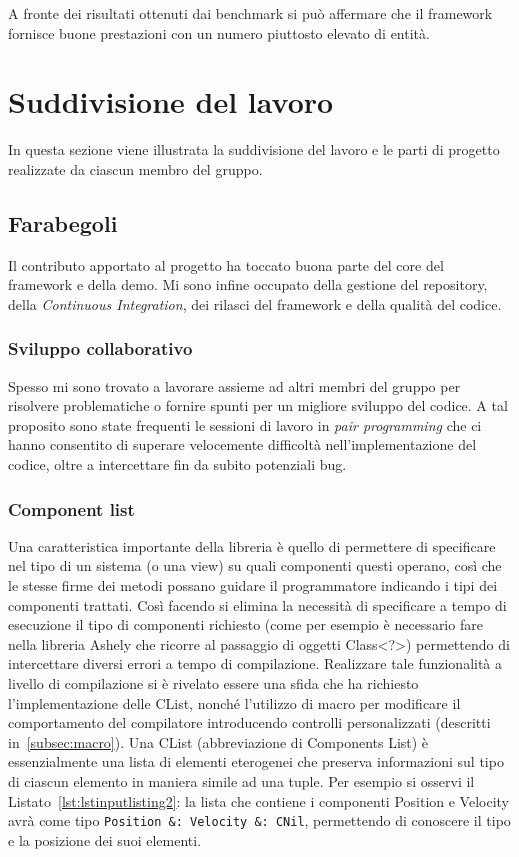 A fronte dei risultati ottenuti dai benchmark si può affermare che il framework fornisce buone prestazioni con un numero
piuttosto elevato di entità.

\section{Suddivisione del lavoro}\label{sec:suddivisione-del-lavoro}
In questa sezione viene illustrata la suddivisione del lavoro e le parti di progetto realizzate da ciascun membro del
gruppo.

\subsection{Farabegoli}\label{subsec:farabegoli}
Il contributo apportato al progetto ha toccato buona parte del core del framework e della demo.
Mi sono infine occupato della gestione del repository, della \textit{Continuous Integration}, dei rilasci del framework
e della qualità del codice.

\subsubsection{Sviluppo collaborativo}
Spesso mi sono trovato a lavorare assieme ad altri membri del gruppo per risolvere problematiche o fornire spunti per
un migliore sviluppo del codice.
A tal proposito sono state frequenti le sessioni di lavoro in \textit{pair programming} che ci hanno consentito di
superare velocemente difficoltà nell'implementazione del codice, oltre a intercettare fin da subito potenziali bug.

\subsubsection{Component list}
Una caratteristica importante della libreria è quello di permettere di specificare nel tipo di un sistema (o una view)
su quali componenti questi operano, così che le stesse firme dei metodi possano guidare il programmatore indicando i
tipi dei componenti trattati.
Così facendo si elimina la necessità di specificare a tempo di esecuzione il tipo di componenti richiesto (come per
esempio è necessario fare nella libreria Ashely  che ricorre al passaggio di oggetti Class<?>)
permettendo di intercettare diversi errori a tempo di compilazione.
Realizzare tale funzionalità a livello di compilazione si è rivelato essere una sfida che ha richiesto l’implementazione
delle CList, nonché l’utilizzo di macro per modificare il comportamento del compilatore introducendo controlli
personalizzati (descritti in~\ref{subsec:macro}).
Una CList (abbreviazione di Components List) è essenzialmente una lista di elementi eterogenei che preserva informazioni
sul tipo di ciascun elemento in maniera simile ad una tuple.
Per esempio si osservi il Listato~\ref{lst:lstinputlisting2}: la lista che contiene
i componenti Position e Velocity avrà come tipo \texttt{Position \&: Velocity \&: CNil}, permettendo di conoscere il
tipo e la posizione dei suoi elementi.

